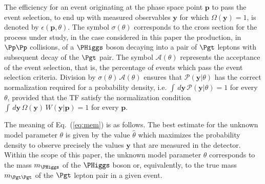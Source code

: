 The efficiency for an event originating at the phase space point
$\bm{p}$ to pass the event selection, \ie to end up with measured
observables $\bm{y}$ for which $\Omega(\bm{y}) = 1$,
is denoted by $\epsilon(\bm{p},\theta)$. 
The symbol $\sigma(\theta)$ corresponds to the cross section for the process under study,
in the case considered in this paper the production, in $\Pp\Pp$
collisions, of a $\PHiggs$ boson decaying into a pair of $\Pgt$ leptons
with subsequent decay of the $\Pgt$ pair.
The symbol $\mathcal{A}(\theta)$ represents the acceptance of the
event selection, that is, the percentage of events which pass the event
selection criteria.
Division by $\sigma(\theta) \, \mathcal{A}(\theta)$ ensures that $\mathcal{P}(\bm{y}|\theta)$ has
the correct normalization required for a probability density, 
i.e. $\int \, d\bm{y} \, \mathcal{P}(\bm{y}|\theta) = 1$ for every $\theta$, 
provided that the TF satisfy the normalization condition
$\int \, d\bm{y} \, \Omega(\bm{y}) \, W(\bm{y}|\bm{p}) = 1$
for every $\bm{p}$.

The meaning of Eq.~(\ref{eq:mem}) is as follows.
The best estimate for the unknown model parameter $\theta$ is given by the
value $\hat{\theta}$ which maximizes the probability density to observe precisely the 
values $\bm{y}$ that are measured in the detector. 
Within the scope of this paper, the unknown model parameter $\theta$
corresponds to the mass $m_{\PHiggs}$ of the $\PHiggs$ boson or,
equivalently, to the true mass $m_{\Pgt\Pgt}$ of the $\Pgt$ lepton
pair in a given event.

